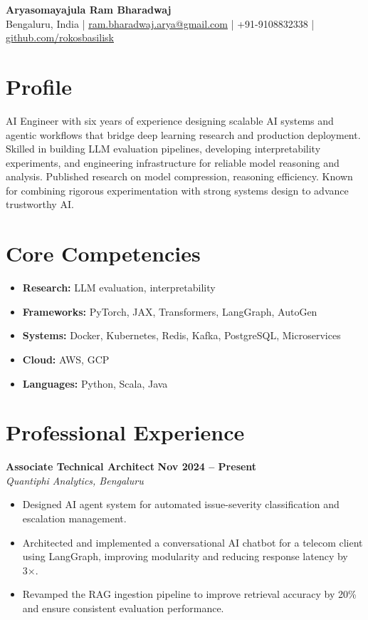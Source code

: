 \documentclass[11pt]{article}
\begin{document}
\begin{center}
\textbf{\Large Aryasomayajula Ram Bharadwaj} \\
\vspace{4pt}
Bengaluru, India | \href{mailto:ram.bharadwaj.arya@gmail.com}{ram.bharadwaj.arya@gmail.com} | +91-9108832338 | \href{https://github.com/rokosbasilisk}{github.com/rokosbasilisk}
\end{center}

\vspace{12pt}

\section{Profile}
AI Engineer with six years of experience designing scalable AI systems and agentic workflows that bridge deep learning research and production deployment. Skilled in building LLM evaluation pipelines, developing interpretability experiments, and engineering infrastructure for reliable model reasoning and analysis. Published research on model compression, reasoning efficiency. Known for combining rigorous experimentation with strong systems design to advance trustworthy AI.

\section{Core Competencies}
\begin{itemize}[leftmargin=*,nosep]
\item \textbf{Research:} LLM evaluation, interpretability
\item \textbf{Frameworks:} PyTorch, JAX, Transformers, LangGraph, AutoGen
\item \textbf{Systems:} Docker, Kubernetes, Redis, Kafka, PostgreSQL, Microservices
\item \textbf{Cloud:} AWS, GCP
\item \textbf{Languages:} Python, Scala, Java
\end{itemize}

\section{Professional Experience}

\textbf{Associate Technical Architect} \hfill \textbf{Nov 2024 – Present}\\
\textit{Quantiphi Analytics, Bengaluru}
\begin{itemize}[leftmargin=*,nosep]
\item Designed AI agent system for automated issue-severity classification and escalation management.
\item Architected and implemented a conversational AI chatbot for a telecom client using LangGraph, improving modularity and reducing response latency by 3×.
\item Revamped the RAG ingestion pipeline to improve retrieval accuracy by 20\% and ensure consistent evaluation performance.
\end{itemize}
\end{document}
